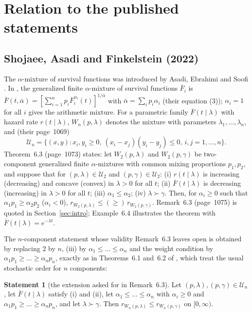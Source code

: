 \documentclass[10pt]{article}
\theoremstyle{plain}
\theoremstyle{definition}
\newtheorem{statement}[theorem]{Statement}
\theoremstyle{remark}
\begin{document}
\section{Relation to the published statements}\label{sec:relation}

\subsection{Shojaee, Asadi and Finkelstein (2022)}\label{sec:SAF}

The $\alpha$-mixture of survival functions was introduced by Asadi, Ebrahimi and Soofi \cite{AsadiEbrahimiSoofi2019}. In \cite{ShojaeeAsadiFinkelstein2022}, the generalized finite $\alpha$-mixture of survival functions $\bar F_i$ is $\bar F(t,\bar\alpha)=[\sum_{i=1}^n p_i\bar F_i^{\alpha_i}(t)]^{1/\bar\alpha}$ with $\bar\alpha=\sum_i p_i\alpha_i$ (their equation (3)); $\alpha_i=1$ for all $i$ gives the arithmetic mixture. For a parametric family $\bar F(t\mid\lambda)$ with hazard rate $r(t\mid\lambda)$, $W_n(p,\lambda)$ denotes the mixture with parameters $\lambda_1,\dots,\lambda_n$, and (their page~1069)
\[
\mathcal U_n=\{(x,y): x_i,y_i\ge 0,\ (x_i-x_j)(y_i-y_j)\le 0,\ i,j=1,\dots,n\}.
\]
Theorem~6.3 (page~1073) states: let $W_2(p,\lambda)$ and $W_2(p,\gamma)$ be two-component generalized finite $\alpha$-mixtures with common mixing proportions $p_1,p_2$, and suppose that for $(p,\lambda)\in\mathcal U_2$ and $(p,\gamma)\in\mathcal U_2$: (i) $r(t\mid\lambda)$ is increasing (decreasing) and concave (convex) in $\lambda>0$ for all $t$; (ii) $\bar F(t\mid\lambda)$ is decreasing (increasing) in $\lambda>0$ for all $t$; (iii) $\alpha_1\le\alpha_2$; (iv) $\lambda\succ\gamma$. Then, for $\alpha_i\ge 0$ such that $\alpha_1p_1\ge\alpha_2p_2$ ($\alpha_i<0$), $r_{W_2(p,\lambda)}\le(\ge)\,r_{W_2(p,\gamma)}$. Remark~6.3 (page~1075) is quoted in Section~\ref{sec:intro}; Example~6.4 illustrates the theorem with $\bar F(t\mid\lambda)=e^{-\lambda t}$.

The $n$-component statement whose validity Remark~6.3 leaves open is obtained by replacing $2$ by $n$, (iii) by $\alpha_1\le\dots\le\alpha_n$ and the weight condition by $\alpha_1p_1\ge\dots\ge\alpha_np_n$, exactly as in Theorems~6.1 and~6.2 of \cite{ShojaeeAsadiFinkelstein2022}, which treat the usual stochastic order for $n$ components:

\begin{statement}[the extension asked for in Remark~6.3]\label{st:SAF}
Let $(p,\lambda),(p,\gamma)\in\mathcal U_n$, let $\bar F(t\mid\lambda)$ satisfy (i) and (ii), let $\alpha_1\le\dots\le\alpha_n$ with $\alpha_i\ge 0$ and $\alpha_1p_1\ge\dots\ge\alpha_np_n$, and let $\lambda\succ\gamma$. Then $r_{W_n(p,\lambda)}\le r_{W_n(p,\gamma)}$ on $[0,\infty)$.
\end{statement}
\end{document}
